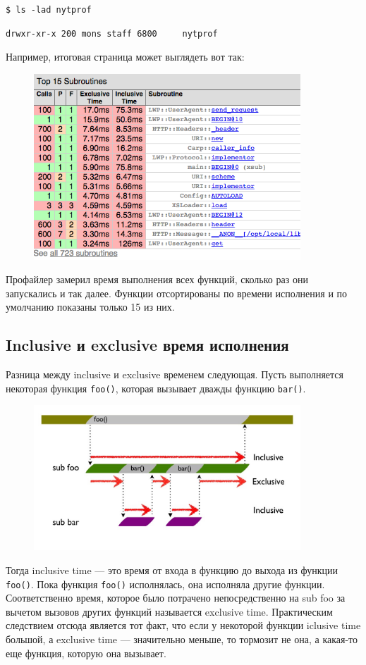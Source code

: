 \begin{verbatim}
$ ls -lad nytprof
\end{verbatim}
\begin{verbatim}
drwxr-xr-x 200 mons staff 6800     nytprof
\end{verbatim}
Например, итоговая страница может выглядеть вот так:
\begin{figure}[H] %
	\centering
	\includegraphics[width=10cm]{lectures/L12/nyt1.png}
\end{figure}


Профайлер замерил время выполнения всех функций, сколько раз они запускались и так далее. Функции отсортированы по времени исполнения и по умолчанию показаны только 15 из них.

\subsection{Inclusive и exclusive время исполнения}
Разница между inclusive и exclusive временем следующая. Пусть выполняется некоторая функция \verb|foo()|, которая вызывает дважды функцию \verb|bar()|.
\begin{figure}[H] %
	\centering
	\includegraphics[width=10cm]{lectures/L12/inclusive-exclusive.jpg}
\end{figure}
Тогда inclusive time --- это время от входа в функцию до выхода из функции \verb|foo()|. Пока функция \verb|foo()| исполнялась, она исполняла другие функции. Соответственно время, которое было потрачено непосредственно на sub foo за вычетом вызовов других функций называется exclusive time. Практическим следствием отсюда является тот факт, что если у некоторой функции iclusive time большой, а exclusive time --- значительно меньше, то тормозит не она, а какая-то еще функция, которую она вызывает.

